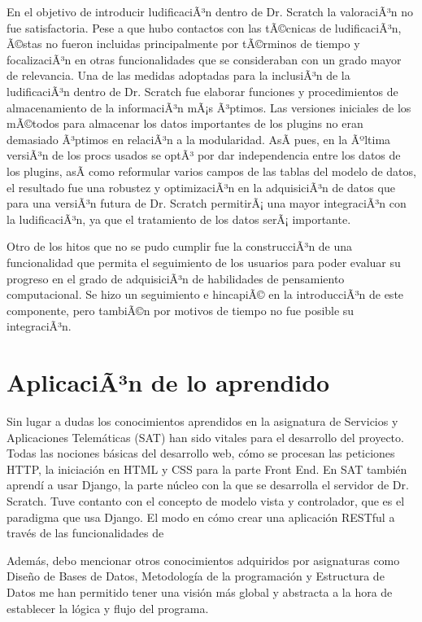 \documentclass[a4paper, 12pt]{book}
\begin{document}
En el objetivo de introducir ludificaciÃ³n dentro de Dr. Scratch la 
valoraciÃ³n no fue satisfactoria. Pese a que hubo contactos con las 
tÃ©cnicas de ludificaciÃ³n, Ã©stas no fueron incluidas principalmente 
por tÃ©rminos de tiempo y focalizaciÃ³n en otras funcionalidades que 
se consideraban con un grado mayor de relevancia. Una de las medidas
adoptadas para la inclusiÃ³n de la ludificaciÃ³n dentro de Dr. Scratch
fue elaborar funciones y procedimientos de almacenamiento de la 
informaciÃ³n mÃ¡s Ã³ptimos. Las versiones iniciales de los mÃ©todos para 
almacenar los datos importantes de los plugins no eran demasiado 
Ã³ptimos en relaciÃ³n a la modularidad. AsÃ­ pues, en la Ãºltima versiÃ³n
de los procs usados se optÃ³ por dar independencia entre los datos de 
los plugins, asÃ­ como reformular varios campos de las tablas del
modelo de datos, el resultado fue una robustez y optimizaciÃ³n en la
adquisiciÃ³n de datos que para una versiÃ³n futura de Dr. Scratch 
permitirÃ¡ una mayor integraciÃ³n con la ludificaciÃ³n, ya que el 
tratamiento de los datos serÃ¡ importante.

Otro de los hitos que no se pudo cumplir fue la construcciÃ³n de una
funcionalidad que permita el seguimiento de los usuarios para poder
evaluar su progreso en el grado de adquisiciÃ³n de habilidades de 
pensamiento computacional. Se hizo un seguimiento e hincapiÃ© en la 
introducciÃ³n de este componente, pero tambiÃ©n por motivos de tiempo
no fue posible su integraciÃ³n. 


\section{AplicaciÃ³n de lo aprendido}
\label{sec:aplicacion}

Sin lugar a dudas los conocimientos aprendidos en la asignatura de Servicios
y Aplicaciones Telemáticas (SAT) han sido vitales para el desarrollo del 
proyecto. Todas las nociones básicas del desarrollo web, cómo se procesan
las peticiones HTTP, la iniciación en HTML y CSS para la parte Front End.
En SAT también aprendí a usar Django, la parte núcleo con la que se 
desarrolla el servidor de Dr. Scratch. Tuve contanto con el concepto de 
modelo vista y controlador, que es el paradigma que usa Django. El modo
en cómo crear una aplicación RESTful a través de las funcionalidades de

Además, debo mencionar otros conocimientos adquiridos por asignaturas como
Diseño de Bases de Datos, Metodología de la programación y Estructura de 
Datos me han permitido tener una visión más global y abstracta a la hora
de establecer la lógica y flujo del programa.
\end{document}
